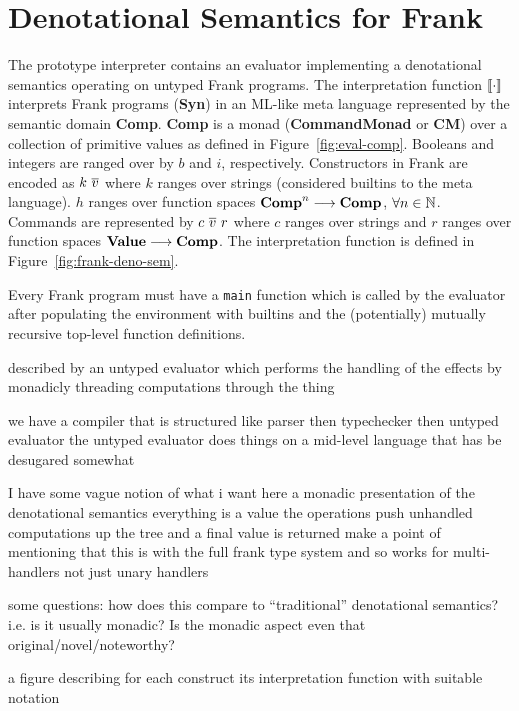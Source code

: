 \section{Denotational Semantics for Frank}
\label{sec:denote}

The prototype interpreter contains an evaluator implementing a denotational
semantics operating on untyped Frank programs. The interpretation function
$\llbracket{\cdot}\rrbracket$ interprets Frank programs (\textbf{Syn}) in an ML-like meta
language represented by the semantic domain \textbf{Comp}. \textbf{Comp} is a
monad (\textbf{CommandMonad} or \textbf{CM})
over a collection of primitive values as defined in
Figure~\ref{fig:eval-comp}. Booleans and integers are ranged over by $b$ and
$i$, respectively. Constructors in Frank are encoded as $k~\overline{v}$ where
$k$ ranges over strings (considered builtins to the meta language). $h$ ranges
over function spaces
$\text{\textbf{Comp}}^n \longrightarrow \text{\textbf{Comp}}$,
$\forall n \in \mathbb{N}$. Commands are represented by $c~\overline{v}~r$
where $c$ ranges over strings and $r$ ranges over function spaces
$\text{\textbf{Value}} \longrightarrow \text{\textbf{Comp}}$.
The interpretation function is defined in Figure~\ref{fig:frank-deno-sem}.

Every Frank
program must have a \verb!main!  function which is called by the evaluator
after populating the environment with builtins and the (potentially) mutually
recursive top-level function definitions.

described by an untyped
evaluator which performs the handling of the effects by monadicly threading
computations through the thing

we have a compiler that is structured like parser then typechecker
then untyped evaluator the untyped evaluator does things on a
mid-level language that has be desugared somewhat

I have some vague notion of what i want here a monadic presentation of the
denotational semantics everything is a value the operations push unhandled
computations up the tree and a final value is returned make a point of
mentioning that this is with the full frank type system and so works for
multi-handlers not just unary handlers

some questions: how does this compare to ``traditional'' denotational
semantics? i.e. is it usually monadic? Is the monadic aspect even that
original/novel/noteworthy?

a figure describing for each construct its interpretation function with
suitable notation

